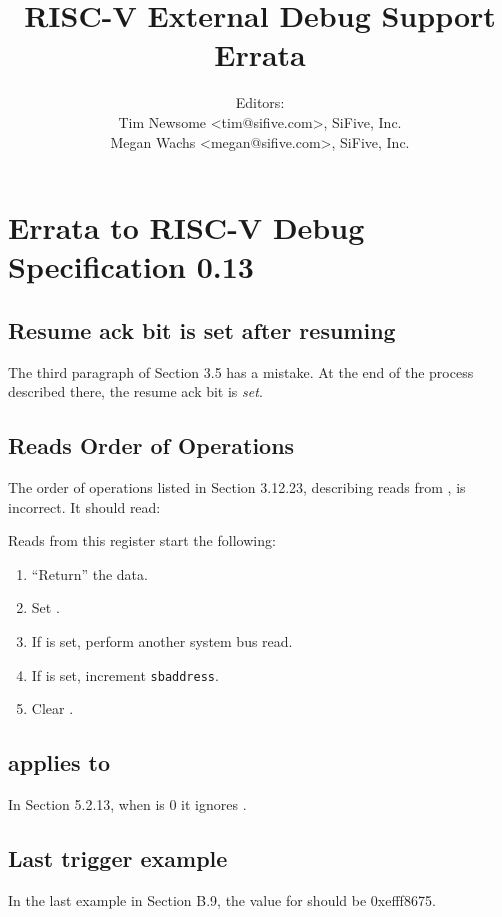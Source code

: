\documentclass[twoside,11pt]{article}
\newenvironment{steps}[1]
  {
     \vspace{1ex}
     \noindent #1
     \begin{enumerate}[nolistsep]
  }
  {
     \end{enumerate}
     \vspace{1ex}
 }
\begin{document}
\title{RISC-V External Debug Support Errata\\
\GITHash
}
\author{Editors: \\
Tim Newsome \textless tim@sifive.com\textgreater, SiFive, Inc. \\
Megan Wachs \textless megan@sifive.com\textgreater, SiFive, Inc.}
\date{\GITAuthorDate}
\maketitle

\section{Errata to RISC-V Debug Specification 0.13}

\subsection{Resume ack bit is set after resuming}

The third paragraph of Section 3.5 has a mistake. At the end of the process
described there, the resume ack bit is \emph{set}.

\subsection{\Rsbdatazero Reads Order of Operations}

The order of operations listed in Section 3.12.23, describing reads from
\Rsbdatazero, is incorrect. It should read:

\begin{steps}{Reads from this register start the following:}
    \item ``Return'' the data.
    \item Set \Fsbbusy.
    \item If \Fsbreadondata is set, perform another system bus read.
    \item If \Fsbautoincrement is set, increment {\tt sbaddress}.
    \item Clear \Fsbbusy.
\end{steps}

\subsection{\Fsselect applies to \Fsvalue}

In Section 5.2.13, when \Fsselect is 0 it ignores \Fsvalue.

\subsection{Last trigger example}

In the last example in Section B.9, the value for  should be
0xefff8675.
\end{document}
